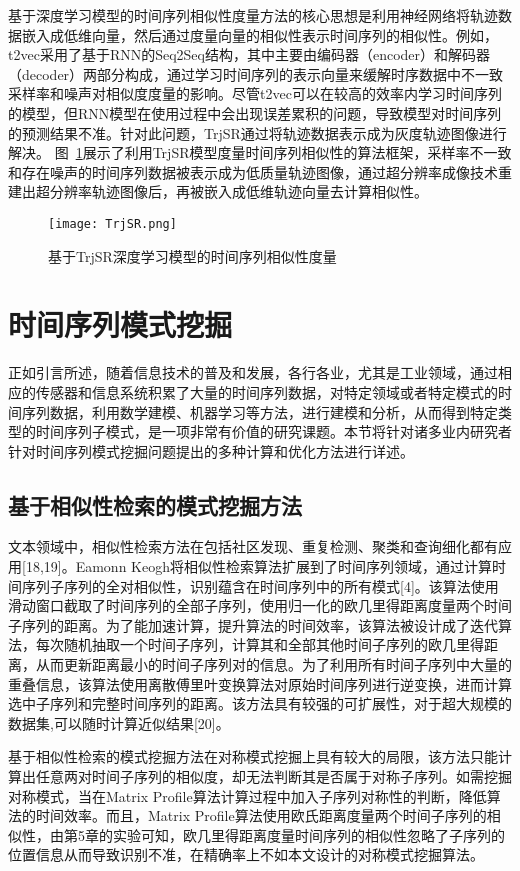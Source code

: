 基于深度学习模型的时间序列相似性度量方法的核心思想是利用神经网络将轨迹数据嵌入成低维向量，然后通过度量向量的相似性表示时间序列的相似性。例如，t2vec采用了基于RNN的Seq2Seq结构，其中主要由编码器（encoder）和解码器（decoder）两部分构成，通过学习时间序列的表示向量来缓解时序数据中不一致采样率和噪声对相似度度量的影响。尽管t2vec可以在较高的效率内学习时间序列的模型，但RNN模型在使用过程中会出现误差累积的问题，导致模型对时间序列的预测结果不准。针对此问题，TrjSR通过将轨迹数据表示成为灰度轨迹图像进行解决。
图~\ref{fig:TrjSR}展示了利用TrjSR模型度量时间序列相似性的算法框架，采样率不一致和存在噪声的时间序列数据被表示成为低质量轨迹图像，通过超分辨率成像技术重建出超分辨率轨迹图像后，再被嵌入成低维轨迹向量去计算相似性。
\begin{figure}
  \centering
  \texttt{[image: TrjSR.png]}
  \caption{基于TrjSR深度学习模型的时间序列相似性度量}
  \label{fig:TrjSR}
\end{figure}

\section{时间序列模式挖掘}
正如引言所述，随着信息技术的普及和发展，各行各业，尤其是工业领域，通过相应的传感器和信息系统积累了大量的时间序列数据，对特定领域或者特定模式的时间序列数据，利用数学建模、机器学习等方法，进行建模和分析，从而得到特定类型的时间序列子模式，是一项非常有价值的研究课题。本节将针对诸多业内研究者针对时间序列模式挖掘问题提出的多种计算和优化方法进行详述。

\subsection{基于相似性检索的模式挖掘方法}
文本领域中，相似性检索方法在包括社区发现、重复检测、聚类和查询细化都有应用[18,19]。Eamonn Keogh将相似性检索算法扩展到了时间序列领域，通过计算时间序列子序列的全对相似性，识别蕴含在时间序列中的所有模式[4]。该算法使用滑动窗口截取了时间序列的全部子序列，使用归一化的欧几里得距离度量两个时间子序列的距离。为了能加速计算，提升算法的时间效率，该算法被设计成了迭代算法，每次随机抽取一个时间子序列，计算其和全部其他时间子序列的欧几里得距离，从而更新距离最小的时间子序列对的信息。为了利用所有时间子序列中大量的重叠信息，该算法使用离散傅里叶变换算法对原始时间序列进行逆变换，进而计算选中子序列和完整时间序列的距离。该方法具有较强的可扩展性，对于超大规模的数据集,可以随时计算近似结果[20]。

基于相似性检索的模式挖掘方法在对称模式挖掘上具有较大的局限，该方法只能计算出任意两对时间子序列的相似度，却无法判断其是否属于对称子序列。如需挖掘对称模式，当在Matrix Profile算法计算过程中加入子序列对称性的判断，降低算法的时间效率。而且，Matrix Profile算法使用欧氏距离度量两个时间子序列的相似性，由第5章的实验可知，欧几里得距离度量时间序列的相似性忽略了子序列的位置信息从而导致识别不准，在精确率上不如本文设计的对称模式挖掘算法。

